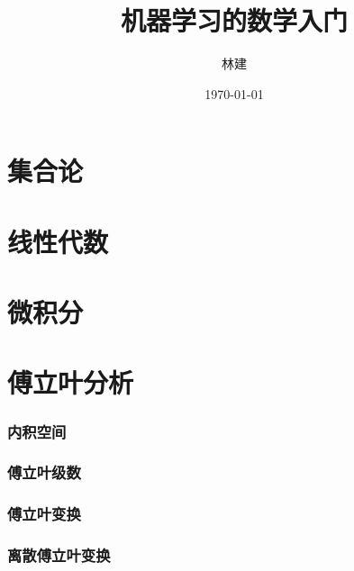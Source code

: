 \documentclass[UTF8]{ctexart}
\title{机器学习的数学入门}
\author{林建}
\date{\today}
\newcommand{\sectionbreak}{\clearpage}
\begin{document}
\maketitle

\tableofcontents


\sectionbreak

\part{集合论}




\sectionbreak
\part{线性代数}






\sectionbreak
\part{微积分}










\sectionbreak

\part{傅立叶分析}



\section{内积空间}

\section{傅立叶级数}

\section{傅立叶变换}

\section{离散傅立叶变换}


\sectionbreak
\end{document}
